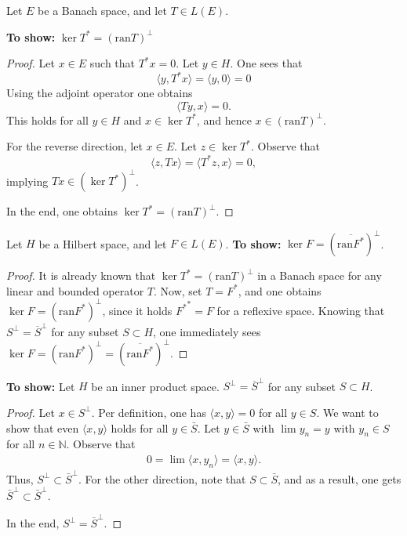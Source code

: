 \documentclass[12pt,letterpaper]{article}
\begin{document}
Let $E$ be a Banach space, and let $T \in L(E)$.

\textbf{To show:} $\ker T^* = (\text{ran} T)^\perp$

\begin{proof}
Let $x \in E$ such that $T^*x = 0$. Let $y \in H$. One sees that
\[
    \langle y, T^*x \rangle = \langle y, 0 \rangle = 0
\]
Using the adjoint operator one obtains
\[
    \langle Ty, x \rangle = 0.
\]
This holds for all $y \in H$ and $x \in \ker T^*$, and hence $x \in (\text{ran} T)^{\perp}$.

For the reverse direction, let $x \in E$. Let $z \in \ker T^*$. Observe that
\[
    \langle z, Tx \rangle = \langle T^* z, x \rangle = 0,
\]
implying $Tx \in (\ker T^*)^\perp$.

In the end, one obtains $\ker T^* = (\text{ran} T)^\perp$.
\end{proof}

Let $H$ be a Hilbert space, and let $F \in L(E)$.
\textbf{To show:} $\ker F = (\overline{\text{ran} F^*})^\perp$.
\begin{proof}
It is already known that $\ker T^* = (\text{ran} T)^\perp$ in a Banach space for any linear and bounded operator $T$. Now, set $T = F^*$, and one obtains $\ker F = (\text{ran} F^*)^\perp$, since it holds ${F^*}^* = F$ for a reflexive space. Knowing that $S^\perp = \overline{S}^\perp$ for any subset $S \subset H$, one immediately sees $\ker F = (\text{ran} F^*)^\perp = (\overline{\text{ran} F^*})^\perp$.
\end{proof}

\textbf{To show:} Let $H$ be an inner product space. $S^\perp = \overline{S}^\perp$ for any subset $S \subset H$.

\begin{proof}
    Let $x \in S^\perp$. Per definition, one has $\langle x,y \rangle = 0$ for all $y \in S$. We want to show that even $\langle x,y \rangle$ holds for all $y \in \bar S$. Let $y \in \bar S$ with $\lim y_n = y$ with $y_n \in S$ for all $n \in \mathbb N$. Observe that
    \begin{align*}
        0 = \lim \langle x,y_n \rangle = \langle x,y \rangle.
    \end{align*}
    Thus, $S^\perp \subset \bar S^\perp$. For the other direction, note that $S \subset \bar S$, and as a result, one gets $\bar S^\perp \subset \bar S^\perp$.

    In the end, $S^\perp = \overline{S}^\perp$.
\end{proof}
\end{document}

